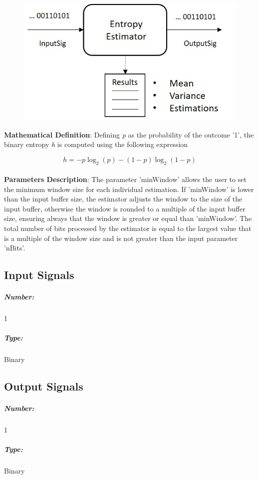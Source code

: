 \begin{figure}[h]
\subsection*{}
    \centerline{
       \includegraphics[scale=0.75]{figures/block_entropy_est.jpg}
    }
\end{figure}

\textbf{Mathematical Definition}: Defining \textit{p} as the probability of the 
outcome '1', the binary entropy \textit{h} is computed using the following expression

\begin{equation}
h = -p\log_2(p) - (1-p)\log_2(1-p)
\end{equation}  
   
\paragraph{}
\textbf{Parameters Description}: The parameter 'minWindow' allows the user to set the 
minimum window size for each individual estimation. If 'minWindow' is lower than the 
input buffer size, the estimator adjusts the window to the size of the input buffer, 
otherwise the window is rounded to a multiple of the input buffer size, ensuring always 
that the window is greater or equal than 'minWindow'. The total number of bits processed 
by the estimator is equal to the largest value that is a multiple of the window size and 
is not greater than the input parameter 'nBits'.

\subsection*{Input Signals}
\subparagraph*{Number:} 1
\subparagraph*{Type:} Binary

\subsection*{Output Signals}
\subparagraph*{Number:} 1
\subparagraph*{Type:} Binary

